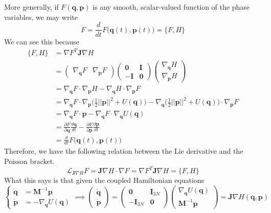 \documentclass{article}
\begin{document}
      More generally, if $F(\mathbf{q}, \mathbf{p})$ is any smooth, scalar-valued function of the phase variables, we may write 
      \[\dot{F} = \frac{d}{dt} F \big( \mathbf{q}(t), \mathbf{p}(t)\big) = \{F, H\}\]
      We can see this because 
      \begin{align*}
        \{F, H\} & = \nabla F^T \mathbf{J} \nabla H \\
        & = \begin{pmatrix}
        \nabla_\mathbf{q} F & \nabla_\mathbf{p} F 
        \end{pmatrix} \begin{pmatrix}
         \mathbf{0} & \mathbf{I} \\ -\mathbf{I} & \mathbf{0} 
        \end{pmatrix} \begin{pmatrix}
        \nabla_\mathbf{q} H \\ \nabla_\mathbf{p} H
        \end{pmatrix} \\
        & = \nabla_\mathbf{q} F \cdot \nabla_\mathbf{p} H - \nabla_\mathbf{q} H \cdot \nabla_\mathbf{p} F \\
        & = \nabla_\mathbf{q} F \cdot \nabla_\mathbf{p} \bigg( \frac{1}{2} ||\mathbf{p}||^2 + U(\mathbf{q}) \bigg) - \nabla_\mathbf{q} \bigg( \frac{1}{2} ||\mathbf{p}||^2 + U(\mathbf{q}) \bigg)  \cdot \nabla_\mathbf{p} F \\
        & = \nabla_\mathbf{q} F \cdot \mathbf{p} - \nabla_\mathbf{q} F \cdot \nabla_\mathbf{q} U(\mathbf{q}) \\
        & = \frac{\partial F}{\partial \mathbf{q}} \frac{ d \mathbf{q}}{d t} - \frac{\partial F}{\partial \mathbf{p}} \frac{d \mathbf{p}}{d t} \\
        & = \frac{d}{d t} F \big( \mathbf{q}(t), \mathbf{p}(t) \big) 
      \end{align*}
      Therefore, we have the following relation between the Lie derivative and the Poisson bracket. 
      \[\mathcal{L}_{\mathbf{J} \nabla H} F = \mathbf{J} \nabla H \cdot \nabla F = \nabla F^T \mathbf{J} \nabla H = \{F, H\}\]
      What this says is that given the coupled Hamiltonian equations
      \[\begin{cases} \boldsymbol{\dot{q}} & = \mathbf{M}^{-1} \mathbf{p} \\
      \boldsymbol{\dot{p}} & = - \nabla_\mathbf{q} U(\mathbf{q}) \end{cases} \implies \begin{pmatrix} \boldsymbol{\dot{q}} \\ \boldsymbol{\dot{p}} \end{pmatrix} = \begin{pmatrix} \mathbf{0} & \mathbf{I}_{3N} \\ -\mathbf{I}_{3N} & \mathbf{0} \end{pmatrix} \begin{pmatrix} \nabla_\mathbf{q} U (\mathbf{q})\\ \mathbf{M}^{-1} \mathbf{p} \end{pmatrix} = \mathbf{J} \nabla H(\mathbf{q}, \mathbf{p})\]
\end{document}
